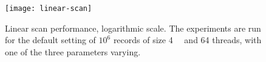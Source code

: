 \begin{figure}[!ht]
	\centering
	\texttt{[image: linear-scan]}
	\caption[Linear scan performance]{
		Linear scan performance, logarithmic scale.
		The experiments are run for the default setting of $10^6$ records of size \SI{4}{\kibi\byte} and 64 threads, with one of the three parameters varying.
	}%
	\label{figure:linear-scan}
\end{figure}
